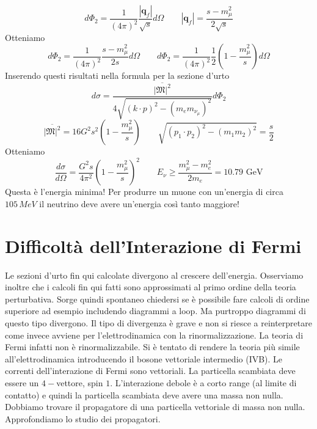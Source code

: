 $$
d\Phi_2 = \frac{1}{(4\pi)^2} \frac{|\mathbf{q}_f|}{\sqrt{s}} d\Omega \qquad |\mathbf{q}_f| = \frac{s - m_\mu^2}{2\sqrt{s}}
$$
Otteniamo
$$
d\Phi_2 = \frac{1}{(4\pi)^2} \frac{s - m_\mu^2}{2s} d\Omega \qquad d\Phi_2 = \frac{1}{(4\pi)^2} \frac{1}{2} \left( 1 - \frac{m_\mu^2}{s} \right) d\Omega
$$
Inserendo questi risultati nella formula per la sezione d'urto
$$
d\sigma = \frac{\overline{|\mathfrak{M}|^2}}{4\sqrt{(k \cdot p)^2 - (m_e m_{\nu_\mu})^2}} d\Phi_2
$$
$$
\overline{|\mathfrak{M}|^2} = 16G^2 s^2 \left( 1 - \frac{m_\mu^2}{s} \right) \qquad \sqrt{(p_1 \cdot p_2)^2 - (m_1 m_2)^2} = \frac{s}{2}
$$
Otteniamo
$$
\frac{d\sigma}{d\Omega} = \frac{G^2 s}{4\pi^2} \left( 1 - \frac{m_\mu^2}{s} \right)^2 \qquad E_\nu \ge \frac{m_\mu^2 - m_e^2}{2m_e} = 10.79 \text{ GeV}
$$
Questa è l'energia minima! Per produrre un muone con un'energia di circa $105\,\unit{MeV}$ il neutrino deve avere un'energia così tanto maggiore!
\section{Difficoltà dell'Interazione di Fermi}
Le sezioni d'urto fin qui calcolate divergono al crescere dell'energia. Osserviamo inoltre che i calcoli fin qui fatti sono approssimati al primo ordine della teoria perturbativa. Sorge quindi spontaneo chiedersi se è possibile fare calcoli di ordine superiore ad esempio includendo diagrammi a loop. Ma purtroppo diagrammi di questo tipo divergono. Il tipo di divergenza è grave e non si riesce a reinterpretare come invece avviene per l'elettrodinamica con la rinormalizzazione. La teoria di Fermi infatti non è rinormalizzabile. Si è tentato di rendere la teoria più simile all'elettrodinamica introducendo il bosone vettoriale intermedio (IVB). Le correnti dell'interazione di Fermi sono vettoriali. La particella scambiata deve essere un $4-$vettore, spin $1$. L'interazione debole è a corto range (al limite di contatto) e quindi la particella scambiata deve avere una massa non nulla. Dobbiamo trovare il propagatore di una particella vettoriale di massa non nulla. Approfondiamo lo studio dei propagatori.
